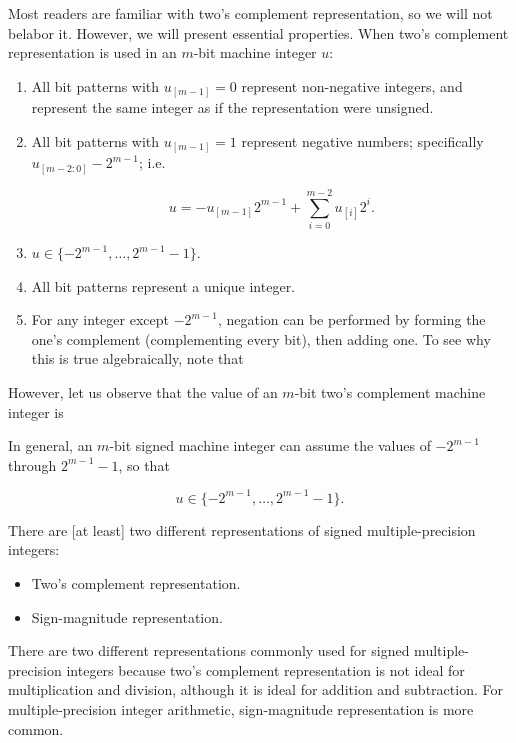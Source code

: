 Most readers are familiar with two's complement representation, so we will not
belabor it.  However, we will present essential properties.
When two's complement representation is used in an $m$-bit machine integer $u$:

\begin{enumerate}
\item All bit patterns with $u_{[m-1]} = 0$ represent non-negative integers, and 
      represent the same integer as if the representation were unsigned.
\item All bit patterns with $u_{[m-1]} = 1$ represent negative numbers; specifically
      $u_{[m-2:0]} - 2^{m-1}$; i.e.

      \begin{equation}
      \label{eq:ccil0:sroi0:sros0:00}
      u = - u_{[m-1]} 2^{m-1} + \sum_{i=0}^{m-2} u_{[i]} 2^i .
      \end{equation}

\item $u \in \{-2^{m-1}, \ldots{}, 2^{m-1}-1 \}$.
\item All bit patterns represent a unique integer.
\item For any integer except $-2^{m-1}$, 
      negation can be performed by forming the one's complement (complementing
      every bit), then adding one.  To see why this is true algebraically, note that

\end{enumerate}


However, let us observe that the value of an
$m$-bit two's complement
machine integer is


In general, an $m$-bit signed machine integer can assume the values of 
$-2^{m-1}$ through $2^{m-1} - 1$, so that

\begin{equation}
\label{eq:ccil0:sroi0:sros0:01}
u \in \{-2^{m-1}, \ldots{} , 2^{m-1} - 1 \} .
\end{equation}

There are [at least] two different representations of signed 
multiple-precision integers:

\begin{itemize}
\item Two's complement representation.
\item Sign-magnitude representation.
\end{itemize}

There are two different representations commonly used 
for signed multiple-precision integers because two's complement
representation is not ideal for multiplication and division, although
it is ideal for addition and subtraction.  For multiple-precision
integer arithmetic, sign-magnitude representation is more common.

